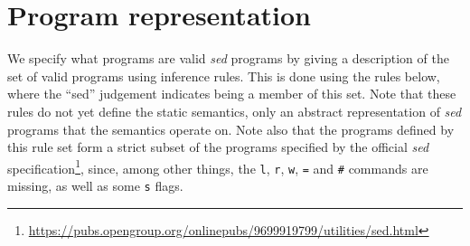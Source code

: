 \documentclass[11pt]{article}
\newcommand\SED{\emph{sed}}
\begin{document}
\section{Program representation}

We specify what programs are valid \SED{} programs by giving a description of the set of valid programs using inference rules.
This is done using the rules below, where the ``sed'' judgement indicates being a member of this set.
Note that these rules do not yet define the static semantics, only an abstract representation of \SED{} programs that the semantics operate on.
Note also that the programs defined by this rule set form a strict subset of the programs specified by the official \SED{} specification\footnote{\url{https://pubs.opengroup.org/onlinepubs/9699919799/utilities/sed.html}}, since, among other things, the \texttt{l}, \texttt{r}, \texttt{w}, \texttt{=} and \texttt{\#} commands are missing, as well as some \texttt{s} flags.

\newcommand\cmd[1]{\ensuremath{\text{\texttt{#1}}}}
\renewcommand\arg[1]{\ensuremath{\mathit{#1}}}
\end{document}
